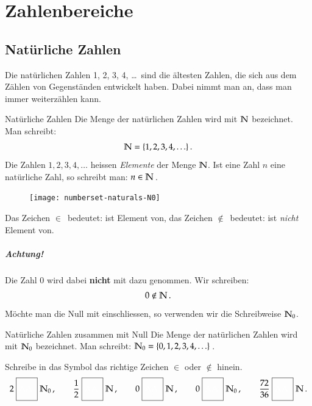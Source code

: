 \chapter{Zahlenbereiche}
\section{Natürliche Zahlen}
Die natürlichen Zahlen 1, 2, 3, 4, \ldots ~sind die ältesten Zahlen, die sich aus dem Zählen von Gegenständen entwickelt haben.
Dabei nimmt man an, dass man immer weiterzählen kann.\\

\begin{defn}{Natürliche Zahlen}
	Die Menge der natürlichen Zahlen wird mit $\mathbb{N}$ bezeichnet.
	Man schreibt:
	\begin{align*} 
	 \mathbb{N} = \{ 1, 2, 3, 4, \ldots \}\, .
	\end{align*}
	Die Zahlen $1, 2, 3, 4, \ldots$ heissen \emph{Elemente} der Menge $\mathbb{N}$.
	Ist eine Zahl $n$ eine natürliche Zahl, so schreibt man: $n\in\mathbb{N}$\,.
\end{defn}

\vspace{.5cm}
\begin{figure}
	\texttt{[image: numberset-naturals-N0]}
\end{figure}
Das Zeichen \glqq $\in$\grqq~bedeutet: \glqq ist Element von\grqq, das Zeichen \glqq $\notin$\grqq~bedeutet: \glqq ist \emph{nicht} Element von\grqq.

\paragraph{Achtung!}
Die Zahl 0 wird dabei {\bfseries nicht} mit dazu genommen.
Wir schreiben:
\begin{align*}
  0 \notin \mathbb{N}\, .
\end{align*}
Möchte man die Null mit einschliessen, so verwenden wir die Schreibweise $\mathbb{N}_0$.\\

\begin{defn}{Natürliche Zahlen zusammen mit Null}
	Die Menge der natürlichen Zahlen wird mit $\mathbb{N}_0$ bezeichnet.
	Man schreibt: $\mathbb{N}_0 = \{ 0, 1, 2, 3, 4, \ldots \}$\,.
\end{defn}

\begin{example}
  Schreibe in das Symbol \relationBox das richtige Zeichen $\in$ oder $\notin$ hinein.
  \begin{align*}
   2 \relationBox \N_0\,,\qquad
   \frac{1}{2} \relationBox \N\,,\qquad
   0 \relationBox \N\,,\qquad
   0 \relationBox \N_0\,,\qquad
   \frac{72}{36} \relationBox \N\,.
  \end{align*}

\end{example}


